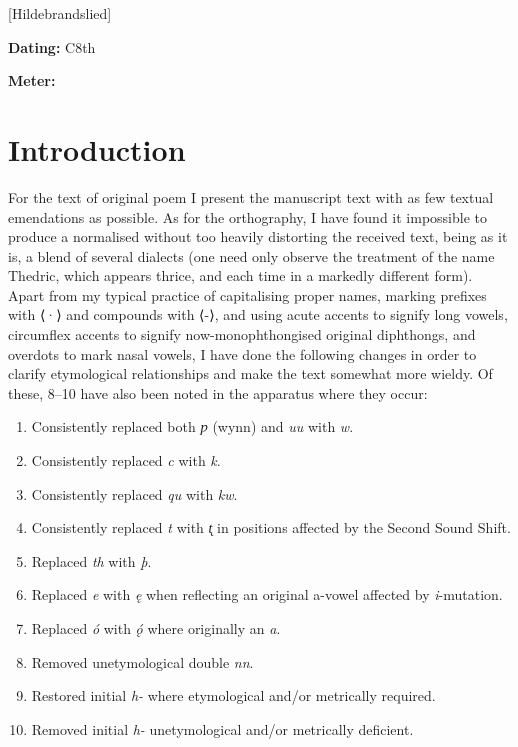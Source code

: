 [Hildebrandslied]

\begin{flushright}%
\textbf{Dating:} C8th

\textbf{Meter:} \Fornyrdislag%
\end{flushright}%

\section{Introduction}

For the text of original poem I present the manuscript text with as few textual emendations as possible. As for the orthography, I have found it impossible to produce a normalised without too heavily distorting the received text, being as it is, a blend of several dialects (one need only observe the treatment of the name Thedric, which appears thrice, and each time in a markedly different form). Apart from my typical practice of capitalising proper names, marking prefixes with ⟨·⟩ and compounds with ⟨-⟩, and using acute accents to signify long vowels, circumflex accents to signify now-monophthongised original diphthongs, and overdots to mark nasal vowels, I have done the following changes in order to clarify etymological relationships and make the text somewhat more wieldy. Of these, 8–10 have also been noted in the apparatus where they occur:
\begin{enumerate}
  \item Consistently replaced both \emph{ƿ} (wynn) and \emph{uu} with \emph{w}.
  \item Consistently replaced \emph{c} with \emph{k}.
  \item Consistently replaced \emph{qu} with \emph{kw}.
  \item Consistently replaced \emph{t} with \emph{t̨} in positions affected by the Second Sound Shift.
  \item Replaced \emph{th} with \emph{þ}.
  \item Replaced \emph{e} with \emph{ę} when reflecting an original a-vowel affected by \emph{i}-mutation.
  \item Replaced \emph{ó} with \emph{ǫ́} where originally an \emph{a}.
  \item Removed unetymological double \emph{nn}.
  \item Restored initial \emph{h-} where etymological and/or metrically required.
  \item Removed initial \emph{h-} unetymological and/or metrically deficient.
\end{enumerate}

